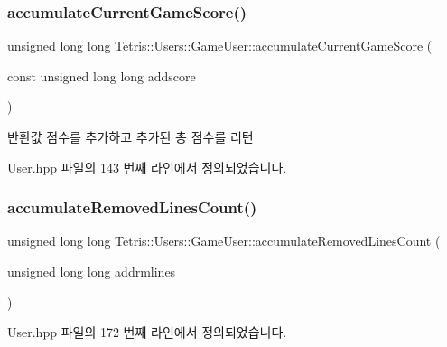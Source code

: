 \subsubsection{\texorpdfstring{accumulate\+Current\+Game\+Score()}{accumulateCurrentGameScore()}}
{\footnotesize\ttfamily unsigned long long Tetris\+::\+Users\+::\+Game\+User\+::accumulate\+Current\+Game\+Score (\begin{DoxyParamCaption}\item[{const unsigned long long}]{addscore }\end{DoxyParamCaption})\hspace{0.3cm}{\ttfamily [inline]}}

\begin{DoxyReturn}{반환값}
점수를 추가하고 추가된 총 점수를 리턴 
\end{DoxyReturn}


User.\+hpp 파일의 143 번째 라인에서 정의되었습니다.

\mbox{\label{class_tetris_1_1_users_1_1_game_user_a89c6053fbb03b4fbfcd3fec883a87765}} 
\subsubsection{\texorpdfstring{accumulate\+Removed\+Lines\+Count()}{accumulateRemovedLinesCount()}}
{\footnotesize\ttfamily unsigned long long Tetris\+::\+Users\+::\+Game\+User\+::accumulate\+Removed\+Lines\+Count (\begin{DoxyParamCaption}\item[{unsigned long long}]{addrmlines }\end{DoxyParamCaption})\hspace{0.3cm}{\ttfamily [inline]}}



User.\+hpp 파일의 172 번째 라인에서 정의되었습니다.

\mbox{\label{class_tetris_1_1_users_1_1_game_user_a93e385fd100ac5ec2f6f6b9f0fab2950}} 
